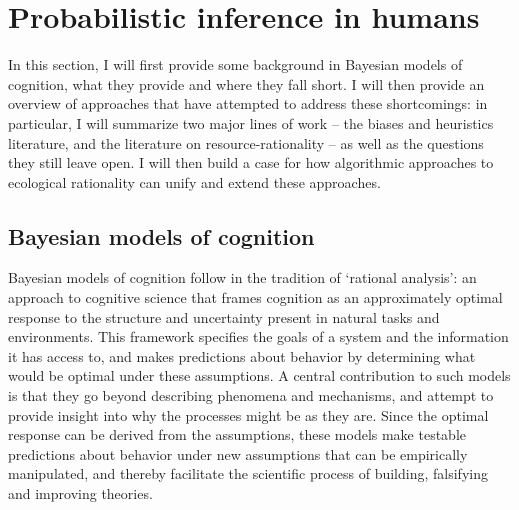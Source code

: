 

\chapter{Probabilistic inference in humans}
\label{chap:psych}

In this section, I will first provide some background in Bayesian models of cognition, what they provide and where they fall short. I will then provide an overview of approaches that have attempted to address these shortcomings: in particular, I will summarize two major lines of work -- the biases and heuristics literature, and the literature on resource-rationality -- as well as the questions they still leave open. I will then build a case for how algorithmic approaches to ecological rationality can unify and extend these approaches.

\section{Bayesian models of cognition}
Bayesian models of cognition follow in the tradition of `rational analysis'\cite{shepard1987toward, anderson1990adaptive}: an approach to cognitive science that frames cognition as an approximately optimal response to the structure and uncertainty present in natural tasks and environments. This framework specifies the goals of a system and the information it has access to, and makes predictions about behavior by determining what would be optimal under these assumptions. A central contribution to such models is that they go beyond describing phenomena and mechanisms, and attempt to provide insight into why the processes might be as they are. Since the optimal response can be derived from the assumptions, these models make testable predictions about behavior under new assumptions that can be empirically manipulated, and thereby facilitate the scientific process of building, falsifying and improving theories.

